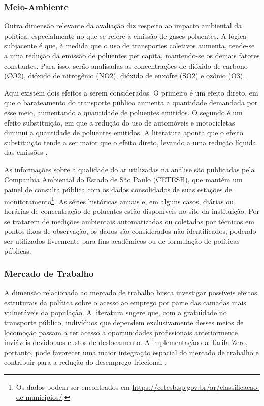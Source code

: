 \subsubsection{Meio-Ambiente}
Outra dimensão relevante da avaliação diz respeito ao impacto ambiental da política, especialmente no que se refere à emissão de gases poluentes. A lógica subjacente é que, à medida que o uso de transportes coletivos aumenta, tende-se a uma redução da emissão de poluentes per capita, mantendo-se os demais fatores constantes. Para isso, serão analisadas as concentrações de dióxido de carbono (CO2), dióxido de nitrogênio (NO2), dióxido de enxofre (SO2) e ozônio (O3).

Aqui existem dois efeitos a serem considerados. O primeiro é um efeito direto, em que o barateamento do transporte público aumenta a quantidade demandada por esse meio, aumentando a quantidade de poluentes emitidos. O segundo é um efeito substituição, em que a redução do uso de automóveis e motocicletas diminui a quantidade de poluentes emitidos. A literatura aponta que o efeito substituição tende a ser maior que o efeito direto, levando a uma redução líquida das emissões \cite{NO_DAM}. 

As informações sobre a qualidade do ar utilizadas na análise são publicadas pela Companhia Ambiental do Estado de São Paulo (CETESB), que mantém um painel de consulta pública com os dados consolidados de suas estações de monitoramento\footnote{Os dados podem ser encontrados em \url{https://cetesb.sp.gov.br/ar/classificacao-de-municipios/}.}. As séries históricas anuais e, em alguns casos, diárias ou horárias de concentração de poluentes estão disponíveis no site da instituição. Por se tratarem de medições ambientais automatizadas ou coletadas por técnicos em pontos fixos de observação, os dados são considerados não identificados, podendo ser utilizados livremente para fins acadêmicos ou de formulação de políticas públicas. 

\subsubsection{Mercado de Trabalho}
A dimensão relacionada ao mercado de trabalho busca investigar possíveis efeitos estruturais da política sobre o acesso ao emprego por parte das camadas mais vulneráveis da população. A literatura sugere que, com a gratuidade no transporte público, indivíduos que dependem exclusivamente desses meios de locomoção passam a ter acesso a oportunidades profissionais anteriormente inviáveis devido aos custos de deslocamento. A implementação da Tarifa Zero, portanto, pode favorecer uma maior integração espacial do mercado de trabalho e contribuir para a redução do desemprego friccional \cite{NO_DAM,BETTER_FIRMS}.

